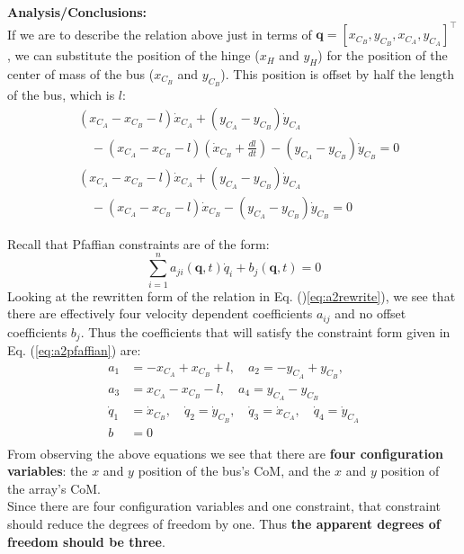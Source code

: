 \documentclass[titlepage]{article}
\begin{document}
\textbf{Analysis/Conclusions:}\\
If we are to describe the relation above just in terms of $\boldsymbol{q}=[x_{C_B},y_{C_B},x_{C_A},y_{C_A}]^\top$, we can substitute the position of the hinge ($x_H$ and $y_H$) for the position of the center of mass of the bus ($x_{C_B}$ and $y_{C_B}$). This position is offset by half the length of the bus, which is $l$:
\begin{equation}
	\begin{split}
		&(x_{C_A}-x_{C_B}-l)\dot{x}_{C_A}+(y_{C_A}-y_{C_B})\dot{y}_{C_A} \\
		&\quad -(x_{C_A}-x_{C_B}-l)\left(\dot{x}_{C_B}+\frac{d l}{d t}\right)-(y_{C_A}-y_{C_B})\dot{y}_{C_B}=0 \\[6pt]
		&(x_{C_A}-x_{C_B}-l)\dot{x}_{C_A}+(y_{C_A}-y_{C_B})\dot{y}_{C_A} \\
		&\quad -(x_{C_A}-x_{C_B}-l)\dot{x}_{C_B}-(y_{C_A}-y_{C_B})\dot{y}_{C_B}=0
	\end{split}
	\label{eq:a2rewrite}
\end{equation}

\begin{mdframed}[linewidth=1pt, innertopmargin=10pt, innerbottommargin=10pt]
	Recall that Pfaffian constraints are of the form:
	\begin{equation}
		\sum_{i=1}^{n} a_{ji}(\boldsymbol{q},t)\dot{q}_i+b_j(\boldsymbol{q},t)=0
		\label{eq:a2pfaffian}
	\end{equation}
	Looking at the rewritten form of the relation in Eq. ()\ref{eq:a2rewrite}), we see that there are effectively four velocity dependent coefficients $a_{ij}$ and no offset coefficients $b_{j}$. Thus the coefficients that will satisfy the constraint form given in Eq. (\ref{eq:a2pfaffian}) are:
	\begin{equation}
		\begin{split}
			a_{1}&=-x_{C_A}+x_{C_B}+l,\quad a_{2}=-y_{C_A}+y_{C_B},\\ 
			a_{3}&=x_{C_A}-x_{C_B}-l,\quad a_{4}=y_{C_A}-y_{C_B}\\
			\dot{q}_1&=\dot{x}_{C_B},\quad \dot{q}_2=\dot{y}_{C_B},\quad \dot{q}_3=\dot{x}_{C_A},\quad \dot{q}_4=\dot{y}_{C_A}\\
			b&=0\\
		\end{split}
	\end{equation}
	From observing the above equations we see that there are \textbf{four configuration variables}: the $x$ and $y$ position of the bus's CoM, and the $x$ and $y$ position of the array's CoM.\\
	
	Since there are four configuration variables and one constraint, that constraint should reduce the degrees of freedom by one. Thus \textbf{the apparent degrees of freedom should be three}.
\end{mdframed}
\end{document}

